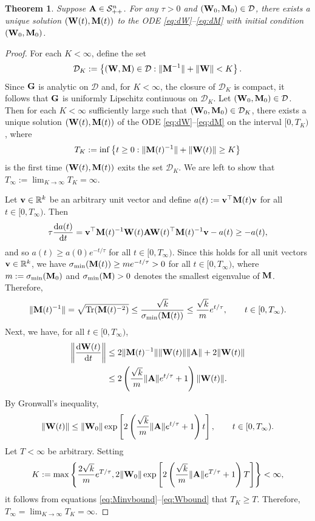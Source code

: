 \documentclass[11pt]{article}
\newtheorem{theorem}{Theorem}
\theoremstyle{definition}
\DeclareMathOperator{\tr}{Tr}
\newcommand{\dd}{\operatorname{d}\!}
\renewcommand{\v}{{\bf v}}
\newcommand{\A}{{\bf A}}
\newcommand{\G}{{\bf G}}
\newcommand{\M}{{\bf M}}
\newcommand{\R}{\mathbb{R}}
\newcommand{\W}{{\bf W}}
\newcommand{\calD}{\mathcal{D}}
\newcommand{\calS}{\mathcal{S}}
\begin{document}
\begin{theorem}\label{thm:exist}
    Suppose $\A\in\calS_{++}^n$. For any $\tau>0$ and $(\W_0,\M_0)\in\calD$, there exists a unique solution $(\W(t),\M(t))$ to the ODE \eqref{eq:dW}--\eqref{eq:dM} with initial condition $(\W_0,\M_0)$.
\end{theorem}

\begin{proof}
For each $K<\infty$, define the set 
    $$\calD_K:=\left\{(\W,\M)\in\calD:\|\M^{-1}\|+\|\W\|<K\right\}.$$
Since $\G$ is analytic on $\calD$ and, for $K<\infty$, the closure of $\calD_K$ is compact, it follows that $\G$ is uniformly Lipschitz continuous on $\calD_K$. Let $(\W_0,\M_0)\in\calD$. Then for each $K<\infty$ sufficiently large such that $(\W_0,\M_0)\in\calD_K$, there exists a unique solution $(\W(t),\M(t))$ of the ODE \eqref{eq:dW}--\eqref{eq:dM} on the interval $[0,T_K)$, where
    $$T_K:=\inf\left\{t\ge0:\|\M(t)^{-1}\|+\|\W(t)\|\ge K\right\}$$
is the first time $(\W(t),\M(t))$ exits the set $\calD_K$. We are left to show that $T_\infty:=\lim_{K\to\infty}T_K=\infty$.

Let $\v\in\R^k$ be an arbitrary unit vector and define $a(t):=\v^\top\M(t)\v$ for all $t\in[0,T_\infty)$. Then
\begin{align*}
    \tau\frac{\dd a(t)}{\dd t}=\v^\top\M(t)^{-1}\W(t)\A\W(t)^\top\M(t)^{-1}\v-a(t)\ge-a(t),
\end{align*}
and so $a(t)\ge a(0)e^{-t/\tau}$ for all $t\in[0,T_\infty)$. Since this holds for all unit vectors $\v\in\R^k$, we have $\sigma_{\min}(\M(t))\ge me^{-t/\tau}>0$ for all $t\in[0,T_\infty)$, where $m:=\sigma_{\min}(\M_0)$ and $\sigma_{\min}(\M)>0$ denotes the smallest eigenvalue of $\M$. Therefore, 
\begin{align}\label{eq:Minvbound}
    \|\M(t)^{-1}\|=\sqrt{\tr(\M(t)^{-2})}\le \frac{\sqrt{k}}{\sigma_{\min}(\M(t))}\le \frac{\sqrt{k}}{m}e^{t/\tau},\qquad t\in[0,T_\infty).
\end{align}
Next, we have, for all $t\in[0,T_\infty)$,
\begin{align*}
    \left\|\frac{\dd\W(t)}{\dd t}\right\|&\le 2\|\M(t)^{-1}\|\|\W(t)\|\|\A\|+2\|\W(t)\|\\
    &\le 2\left(\frac{\sqrt{k}}{m}\|\A\|e^{t/\tau}+1\right)\|\W(t)\|.
\end{align*}
By Gronwall's inequality,
\begin{align}\label{eq:Wbound}
    \|\W(t)\|\le\|\W_0\|\exp\left[2\left(\frac{\sqrt{k}}{m}\|\A\|e^{t/\tau}+1\right)t\right],\qquad t\in[0,T_\infty).
\end{align}
Let $T<\infty$ be arbitrary. Setting
\begin{align*}
    K:=\max\left\{\frac{2\sqrt{k}}{m}e^{T/\tau},2\|\W_0\|\exp\left[2\left(\frac{\sqrt{k}}{m}\|\A\|e^{T/\tau}+1\right)T\right]\right\}<\infty,
\end{align*}
it follows from equations \eqref{eq:Minvbound}--\eqref{eq:Wbound} that $T_K\ge T$. Therefore, $T_\infty=\lim_{K\to\infty}T_K=\infty$.
\end{proof}
\end{document}
